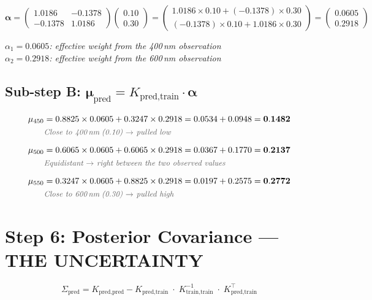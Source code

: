 \documentclass[11pt, a4paper]{article}
\newcommand{\expl}[1]{{\small\color{explgray}\textit{#1}}}
\begin{document}
\[
\boldsymbol{\alpha} =
\begin{pmatrix} 1.0186 & -0.1378 \\ -0.1378 & 1.0186 \end{pmatrix}
\begin{pmatrix} 0.10 \\ 0.30 \end{pmatrix}
=
\begin{pmatrix}
1.0186 \times 0.10 + (-0.1378) \times 0.30 \\
(-0.1378) \times 0.10 + 1.0186 \times 0.30
\end{pmatrix}
=
\begin{pmatrix} 0.0605 \\ 0.2918 \end{pmatrix}
\]

\expl{$\alpha_1 = 0.0605$: effective weight from the 400\,nm observation}\\
\expl{$\alpha_2 = 0.2918$: effective weight from the 600\,nm observation}

\subsection*{Sub-step B: $\boldsymbol{\mu}_{\text{pred}} = K_{\text{pred,train}} \cdot \boldsymbol{\alpha}$}

\begin{align*}
\mu_{450} &= 0.8825 \times 0.0605 + 0.3247 \times 0.2918 = 0.0534 + 0.0948 = \mathbf{0.1482} \\
  & \expl{Close to 400\,nm\;(0.10) $\rightarrow$ pulled low} \\[6pt]
\mu_{500} &= 0.6065 \times 0.0605 + 0.6065 \times 0.2918 = 0.0367 + 0.1770 = \mathbf{0.2137} \\
  & \expl{Equidistant $\rightarrow$ right between the two observed values} \\[6pt]
\mu_{550} &= 0.3247 \times 0.0605 + 0.8825 \times 0.2918 = 0.0197 + 0.2575 = \mathbf{0.2772} \\
  & \expl{Close to 600\,nm\;(0.30) $\rightarrow$ pulled high}
\end{align*}


\section*{\color{secblue}Step 6: Posterior Covariance — THE UNCERTAINTY}

\[
\Sigma_{\text{pred}} = K_{\text{pred,pred}} - K_{\text{pred,train}} \;\cdot\; K_{\text{train,train}}^{-1} \;\cdot\; K_{\text{pred,train}}^\top
\]
\end{document}
